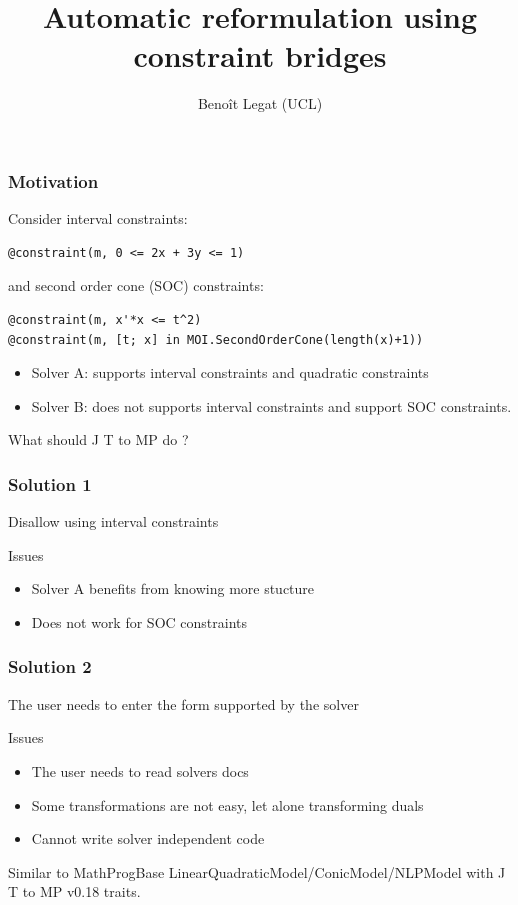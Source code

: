 \documentclass{beamer}
\title{Automatic reformulation using constraint bridges}
\author{Beno\^it Legat (UCL)}
\institute{Universit\'e catholique de Louvain (UCL)}
\makeatletter
\newcommand{\JuMP}
{
J%
{%
  \sbox \z@ T%
  \vbox to\ht \z@ {%
    \hbox {%
      \check@mathfonts%
      \math@fontsfalse%
      \selectfont%
      u%
    }%
    \vss%
  }%
}%
MP
}
\makeatother
\begin{document}
\maketitle
\begin{frame}[fragile]
  \frametitle{Motivation}
  Consider interval constraints:
\begin{verbatim}
@constraint(m, 0 <= 2x + 3y <= 1)
\end{verbatim}
  and second order cone (SOC) constraints: %
\begin{verbatim}
@constraint(m, x'*x <= t^2)
@constraint(m, [t; x] in MOI.SecondOrderCone(length(x)+1))
\end{verbatim}
  \begin{itemize}
    \item Solver A: supports interval constraints and quadratic constraints
    \item Solver B: does \alert{not} supports interval constraints and support SOC constraints.
  \end{itemize}
  What should \JuMP{} do ?
\end{frame}

\begin{frame}
  \frametitle{Solution 1}
  Disallow using interval constraints
  \begin{block}{Issues}
    \begin{itemize}
      \item Solver A benefits from knowing more stucture
      \item Does not work for SOC constraints
    \end{itemize}
  \end{block}
\end{frame}

\begin{frame}
  \frametitle{Solution 2}
  The user needs to enter the form supported by the solver
  \begin{block}{Issues}
    \begin{itemize}
      \item The user needs to read solvers docs
      \item Some transformations are not easy, let alone transforming duals
      \item Cannot write solver independent code
    \end{itemize}
  \end{block}
  Similar to MathProgBase LinearQuadraticModel/ConicModel/NLPModel with \JuMP{} v0.18 traits.
\end{frame}
\end{document}
